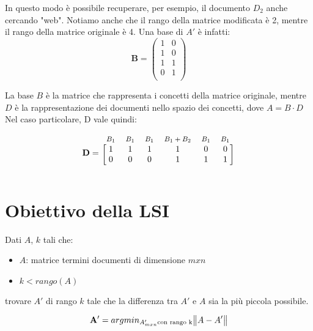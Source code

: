   In questo modo è possibile recuperare, per esempio, il documento $D_2$ anche cercando "web".
  Notiamo anche che il rango della matrice modificata è 2, mentre il rango della matrice originale è 4.
  Una base di $A'$ è infatti:
  \begin{equation}
    \mathbf{B} = \begin{pmatrix}
        1 & 0 \\
        1 & 0 \\
        1 & 1 \\
        0 & 1 \\   
    \end{pmatrix}
\end{equation}

La base $B$ è la matrice che rappresenta i concetti della matrice originale, mentre $D$ è la rappresentazione dei documenti nello spazio dei concetti, dove $A = B \cdot D$
Nel caso particolare, D vale quindi:

 \begin{equation*}
    \mathbf{D}=
    \begin{blockarray}{*{6}{c} l}
      \begin{block}{*{6}{>{$\footnotesize}c<{$}} l}
        $B_1$ & $B_1$ & $B_1$ & $B_1 + B_2$ & $B_1$ & $B_1$ \\
      \end{block}
      \begin{block}{[*{6}{c}]>{$\footnotesize}l<{$}}
        1 & 1 & 1 & 1 & 0 & 0 \\
        0 & 0 & 0 & 1 & 1 & 1 \\
      \end{block}
    \end{blockarray}
  \end{equation*}

\section{Obiettivo della LSI}
Dati $A$, $k$ tali che: 
\begin{itemize}
    \item  $A$: matrice termini documenti di dimensione $mxn$
    \item  $k <  rango(A)$
\end{itemize}
trovare $A'$ di rango $k$ tale che la differenza tra $A'$ e $A$ sia la più piccola possibile.

\begin{equation*}
 \mathbf{A'} = argmin_{A'_{m x n} \text{con rango k}} \norm{A - A'}
\end{equation*}

